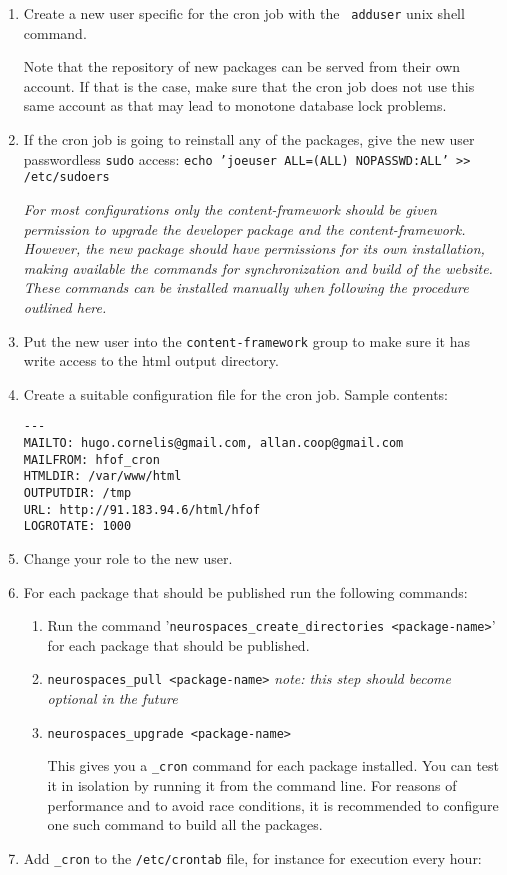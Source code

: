 \documentclass[12pt]{article}
\begin{document}
\begin{enumerate}
\item Create a new user specific for the cron job with the {\tt
    adduser} unix shell command.

  Note that the repository of new packages can be served from their
  own account.  If that is the case, make sure that the cron job does
  not use this same account as that may lead to monotone database lock
  problems.

\item If the cron job is going to reinstall any of the packages, give
  the new user passwordless {\tt sudo} access: {\tt echo 'joeuser
    ALL=(ALL) NOPASSWD:ALL' >> /etc/sudoers}

  {\it For most configurations only the content-framework should be
    given permission to upgrade the developer package and the
    content-framework.  However, the new package should have
    permissions for its own installation, making available the
    commands for synchronization and build of the website.  These
    commands can be installed manually when following the procedure
    outlined here.}

\item Put the new user into the {\tt content-framework} group to make
  sure it has write access to the html output directory.
\item Create a suitable configuration file for the cron job.  Sample
  contents:
\begin{verbatim}
---
MAILTO: hugo.cornelis@gmail.com, allan.coop@gmail.com
MAILFROM: hfof_cron
HTMLDIR: /var/www/html
OUTPUTDIR: /tmp
URL: http://91.183.94.6/html/hfof
LOGROTATE: 1000
\end{verbatim}
\item Change your role to the new user.
\item For each package that should be published run the following
  commands:
  \begin{enumerate}
  \item Run the command '{\tt neurospaces\_create\_directories
      <package-name>}' for each package that should be published.
  \item {\tt neurospaces\_pull <package-name>} {\it note: this step should
      become optional in the future}
  \item {\tt neurospaces\_upgrade <package-name>}

    This gives you a {\tt <package-name>\_cron} command for each
    package installed.  You can test it in isolation by running it
    from the command line.  For reasons of performance and to avoid
    race conditions, it is recommended to configure one such command
    to build all the packages.
  \end{enumerate}
\item Add {\tt <package-name>\_cron} to the {\tt /etc/crontab} file, for
  instance for execution every hour:


\end{enumerate}
\end{document}
